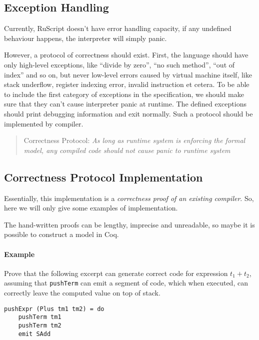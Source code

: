 \documentclass[]{article}
\numberwithin{equation}{section}
\numberwithin{figure}{section}
\numberwithin{table}{section}
\begin{document}
\subsection{Exception Handling}\label{exception-handling}

Currently, RuScript doesn't have error handling capacity, if any
undefined behaviour happens, the interpreter will simply panic.

However, a protocol of correctness should exist. First, the language
should have only high-level exceptions, like ``divide by zero'', ``no
such method'', ``out of index'' and so on, but never low-level errors caused by
virtual machine itself, like stack underflow, register indexing error,
invalid instruction et cetera. To be able to include the first category of
exceptions in the specification, we should make sure that
they can't cause interpreter panic at runtime. The defined exceptions should
print debugging information and exit normally. Such a protocol should be implemented
by compiler.

\begin{quote}
Correctness Protocol: \emph{As long as runtime system is enforcing the
formal model, any compiled code should not cause panic to runtime
system} 
\end{quote}


\subsection{Correctness Protocol Implementation}

Essentially, this implementation is a \emph{correctness proof of an existing compiler}.
So, here we will only give some examples of implementation.

The hand-written proofs can be lengthy, imprecise and unreadable, so
maybe it is possible to construct a model in Coq.

\paragraph{Example}\label{example}

Prove that the following excerpt can generate correct code for expression
$t_1 + t_2$, assuming that \texttt{pushTerm} can emit a segment of code,
which when executed, can correctly leave the computed value on top of stack.

\begin{verbatim}
pushExpr (Plus tm1 tm2) = do
    pushTerm tm1
    pushTerm tm2
    emit SAdd
\end{verbatim}
\end{document}
